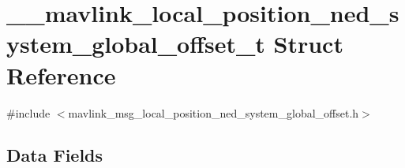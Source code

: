 \hypertarget{struct____mavlink__local__position__ned__system__global__offset__t}{\section{\+\_\+\+\_\+mavlink\+\_\+local\+\_\+position\+\_\+ned\+\_\+system\+\_\+global\+\_\+offset\+\_\+t Struct Reference}
\label{struct____mavlink__local__position__ned__system__global__offset__t}
}


{\ttfamily \#include $<$mavlink\+\_\+msg\+\_\+local\+\_\+position\+\_\+ned\+\_\+system\+\_\+global\+\_\+offset.\+h$>$}

\subsection*{Data Fields}
